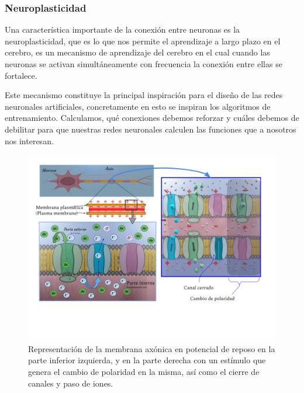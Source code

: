 \subsubsection{Neuroplasticidad}

Una característica importante de la conexión entre neuronas es la neuroplasticidad, que es lo que nos permite el aprendizaje a largo plazo en el cerebro, es un mecanismo de aprendizaje del cerebro en el cual cuando las neuronas se activan simultáneamente con frecuencia la conexión entre ellas se fortalece.


Este mecanismo constituye la principal inspiración para el diseño de las redes neuronales artificiales, concretamente en esto se inspiran los algoritmos de entrenamiento. Calculamos, qué conexiones debemos reforzar y cuáles debemos de debilitar para que nuestras redes neuronales calculen las funciones que a nosotros nos interesan. 


\begin{figure}[h]
 \centering
 \includegraphics[scale=0.5]{../Figuras/MembranaP.png}
 \caption{Representación de la membrana axónica en potencial de reposo en la parte inferior izquierda, y en la parte derecha con un estímulo que genera el cambio de polaridad en la misma, así como el cierre de canales y paso de iones.}
 \label{fig:MembranaP}
\end{figure}









